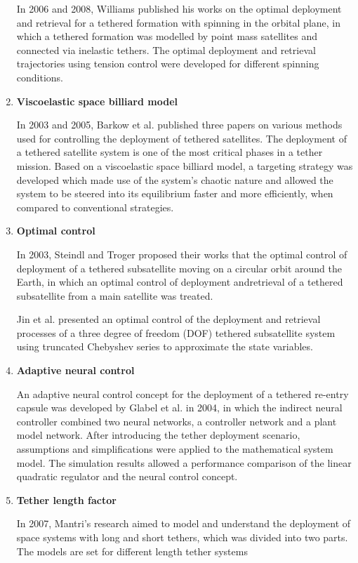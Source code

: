 \begin{enumerate}
In 2006 and 2008, Williams published his works on the optimal deployment and retrieval for a tethered formation with spinning in the orbital plane, in which a tethered formation was modelled by point mass satellites and connected via inelastic tethers. The optimal deployment and retrieval trajectories using tension control were developed for different spinning conditions.


\item \textbf{Viscoelastic space billiard model}

In 2003 and 2005, Barkow et al. published three papers on various methods used for controlling the deployment of tethered satellites. The deployment of a tethered satellite system is one of the most critical phases in a tether mission. Based on a viscoelastic space billiard model, a targeting strategy was developed which made use of the system's chaotic nature and allowed the system to be steered into its equilibrium faster and more efficiently, when compared to conventional strategies.

\item \textbf{Optimal control}

In 2003, Steindl and Troger proposed their works that the optimal control of deployment of a tethered subsatellite moving on a circular orbit around the Earth, in which an optimal control of deployment andretrieval of a tethered subsatellite from a main satellite was treated.

Jin et al. presented an optimal control of the deployment and retrieval processes of a three degree of freedom (DOF) tethered subsatellite system using truncated Chebyshev series to approximate the state variables.

\item \textbf{Adaptive neural control}

An adaptive neural control concept for the deployment of a tethered re-entry capsule was developed by Glabel et al. in 2004, in which the indirect neural controller combined two neural networks, a controller network and a plant model network. After introducing the tether deployment scenario, assumptions and simplifications were applied to the mathematical system model. The simulation results allowed a performance comparison of the linear quadratic regulator and the neural control concept.

\item \textbf{Tether length factor}

In 2007, Mantri's research aimed to model and understand the deployment of space systems with long and short tethers, which was divided into two parts. The models are set for different length tether systems 


\end{enumerate}
